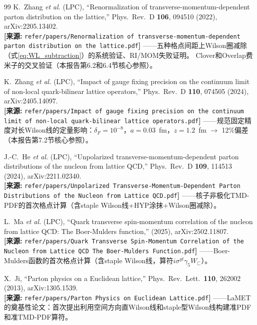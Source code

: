 \documentclass[12pt,a4paper]{ctexart}
\theoremstyle{definition}
\begin{document}
\begin{thebibliography}{99}
K.~Zhang \textit{et al.} (LPC),
``Renormalization of transverse-momentum-dependent parton distribution on the lattice,''
Phys.\ Rev.\ D \textbf{106}, 094510 (2022), arXiv:2205.13402.
\\\textbf{[来源:} \texttt{refer/papers/Renormalization of transverse-momentum-dependent parton distribution on the lattice.pdf}\textbf{]}
——五种格点间距上Wilson圈减除（式\ref{eq:WL_subtraction}）的系统验证、RI/MOM失败证明。
Clover和Overlap费米子的交叉验证（本报告第6.2和6.4节核心参照）。

K.~Zhang \textit{et al.} (LPC),
``Impact of gauge fixing precision on the continuum limit of non-local quark-bilinear lattice operators,''
Phys.\ Rev.\ D \textbf{110}, 074505 (2024), arXiv:2405.14097.
\\\textbf{[来源:} \texttt{refer/papers/Impact of gauge fixing precision on the continuum limit of non-local quark-bilinear lattice operators.pdf}\textbf{]}
——规范固定精度对长Wilson线的定量影响：$\delta_F=10^{-8}$，$a=0.03$~fm，$z=1.2$~fm $\to$ 12\%偏差（本报告第7.2节核心参照）。

J.-C.~He \textit{et al.} (LPC),
``Unpolarized transverse-momentum-dependent parton distributions of the nucleon from lattice QCD,''
Phys.\ Rev.\ D \textbf{109}, 114513 (2024), arXiv:2211.02340.
\\\textbf{[来源:} \texttt{refer/papers/Unpolarized Transverse-Momentum-Dependent Parton Distributions of the Nucleon from Lattice QCD.pdf}\textbf{]}
——核子非极化TMD-PDF的首次格点计算（含staple Wilson线+HYP涂抹+Wilson圈减除）。

L.~Ma \textit{et al.} (LPC),
``Quark transverse spin-momentum correlation of the nucleon from lattice QCD: The Boer-Mulders function,''
(2025), arXiv:2502.11807.
\\\textbf{[来源:} \texttt{refer/papers/Quark Transverse Spin-Momentum Correlation of the Nucleon from Lattice QCD The Boer-Mulders Function.pdf}\textbf{]}
——Boer-Mulders函数的首次格点计算（含staple Wilson线，算符$i\sigma^{yt}\gamma_5 W_{\sqsubset}$）。

X.~Ji,
``Parton physics on a Euclidean lattice,''
Phys.\ Rev.\ Lett.\ \textbf{110}, 262002 (2013), arXiv:1305.1539.
\\\textbf{[来源:} \texttt{refer/papers/Parton Physics on Euclidean Lattice.pdf}\textbf{]}
——LaMET的奠基性论文：首次提出利用空间方向直Wilson线和staple型Wilson线构建准PDF和准TMD-PDF算符。


\end{thebibliography}
\end{document}
